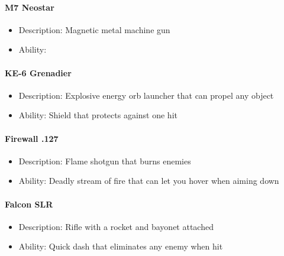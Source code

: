 \documentclass[../Main.tex]{subfiles}
\begin{document}
\paragraph{M7 Neostar}

\begin{itemize}
	\item Description: Magnetic metal machine gun
	\item Ability:
\end{itemize} 


\paragraph{KE-6 Grenadier}
 
\begin{itemize}
	\item Description: Explosive energy orb launcher that can propel any object
	\item Ability: Shield that protects against one hit
\end{itemize} 

\paragraph{Firewall .127}

\begin{itemize}
	\item Description: Flame shotgun that burns enemies
	\item Ability: Deadly stream of fire that can let you hover when aiming down
\end{itemize} 

\paragraph{Falcon SLR}

\begin{itemize}
	\item Description: Rifle with a rocket and bayonet attached
	\item Ability: Quick dash that eliminates any enemy when hit
\end{itemize} 
\end{document}
